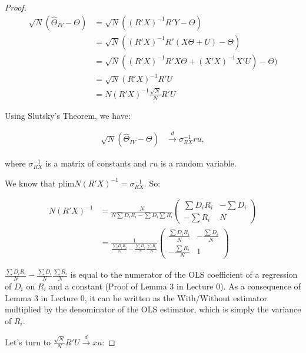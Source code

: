 \documentclass[
]{book}
\newcommand{\plims}{\text{plim}}
\theoremstyle{definition}
\theoremstyle{definition}
\theoremstyle{definition}
\theoremstyle{definition}
\theoremstyle{remark}
\begin{document}
\begin{proof}
\iffalse{} {Proof. } \fi{}\begin{align*}
\sqrt{N}(\hat{\Theta}_{IV}-\Theta) & = \sqrt{N}((R'X)^{-1}R'Y-\Theta) \\
                                    & = \sqrt{N}((R'X)^{-1}R'(X\Theta+U)-\Theta) \\
                                    & = \sqrt{N}((R'X)^{-1}R'X\Theta+(X'X)^{-1}X'U)-\Theta) \\
                                    & = \sqrt{N}(R'X)^{-1}R'U \\
                                    & = N(R'X)^{-1}\frac{\sqrt{N}}{N}R'U
\end{align*}

Using Slutsky's Theorem, we have:

\begin{align*}
\sqrt{N}(\hat{\Theta}_{IV}-\Theta) & \stackrel{d}{\rightarrow} \sigma_{RX}^{-1}ru,
\end{align*}

where \(\sigma_{RX}^{-1}\) is a matrix of constants and \(ru\) is a random variable.

We know that \(\plims N(R'X)^{-1}=\sigma_{RX}^{-1}\).
So:

\begin{align*}
N(R'X)^{-1} & = \frac{N}{N\sum D_iR_i-\sum D_i\sum R_i}\left(\begin{array}{cc} \sum D_iR_i & -\sum D_i \\ -\sum R_i & N \end{array}\right) \\
            & = \frac{1}{\frac{\sum D_iR_i}{N}-\frac{\sum D_i}{N}\frac{\sum R_i}{N}} 
                  \left(\begin{array}{cc} 
                          \frac{\sum D_iR_i}{N} & -\frac{\sum D_i}{N} \\ -\frac{\sum R_i}{N} & 1 
                        \end{array}
                  \right) 
\end{align*}

\(\frac{\sum D_iR_i}{N}-\frac{\sum D_i}{N}\frac{\sum R_i}{N}\) is equal to the numerator of the OLS coefficient of a regression of \(D_i\) on \(R_i\) and a constant (Proof of Lemma 3 in Lecture 0).
As a consequence of Lemma 3 in Lecture 0, it can be written as the With/Without estimator multiplied by the denominator of the OLS estimator, which is simply the variance of \(R_i\).

Let's turn to \(\frac{\sqrt{N}}{N}R'U\stackrel{d}{\rightarrow}xu\):


\end{proof}
\end{document}
